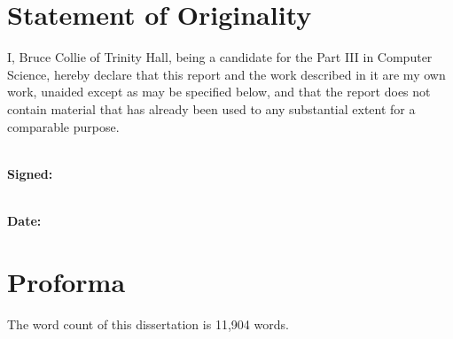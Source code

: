 \section*{Statement of Originality}

I, Bruce Collie of Trinity Hall, being a candidate for the Part III in Computer
Science, hereby declare that this report and the work described in it are my own
work, unaided except as may be specified below, and that the report does not
contain material that has already been used to any substantial extent for a
comparable purpose.

\vspace{0.5cm}

\noindent
\\\textbf{Signed:}

\vspace{0.5cm}

\noindent
\\\textbf{Date:}

\section*{Proforma}

The word count of this dissertation is 11,904 words.
